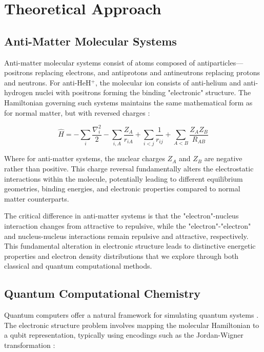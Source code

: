 \documentclass[10pt,twocolumn,a4paper]{article}
\begin{document}
\section{Theoretical Approach}

\subsection{Anti-Matter Molecular Systems}
Anti-matter molecular systems consist of atoms composed of antiparticles—positrons replacing electrons, and antiprotons and antineutrons replacing protons and neutrons. For anti-HeH$^+$, the molecular ion consists of anti-helium and anti-hydrogen nuclei with positrons forming the binding "electronic" structure. The Hamiltonian governing such systems maintains the same mathematical form as for normal matter, but with reversed charges \cite{griffiths2018introduction}:

\begin{equation}
\hat{H} = -\sum_i \frac{\nabla_i^2}{2} - \sum_{i,A} \frac{Z_A}{r_{iA}} + \sum_{i<j} \frac{1}{r_{ij}} + \sum_{A<B} \frac{Z_A Z_B}{R_{AB}}
\end{equation}

Where for anti-matter systems, the nuclear charges $Z_A$ and $Z_B$ are negative rather than positive. This charge reversal fundamentally alters the electrostatic interactions within the molecule, potentially leading to different equilibrium geometries, binding energies, and electronic properties compared to normal matter counterparts.

The critical difference in anti-matter systems is that the "electron"-nucleus interaction changes from attractive to repulsive, while the "electron"-"electron" and nucleus-nucleus interactions remain repulsive and attractive, respectively. This fundamental alteration in electronic structure leads to distinctive energetic properties and electron density distributions that we explore through both classical and quantum computational methods.

\subsection{Quantum Computational Chemistry}
Quantum computers offer a natural framework for simulating quantum systems \cite{georgescu2014quantum}. The electronic structure problem involves mapping the molecular Hamiltonian to a qubit representation, typically using encodings such as the Jordan-Wigner transformation \cite{cao2019quantum}:
\end{document}

